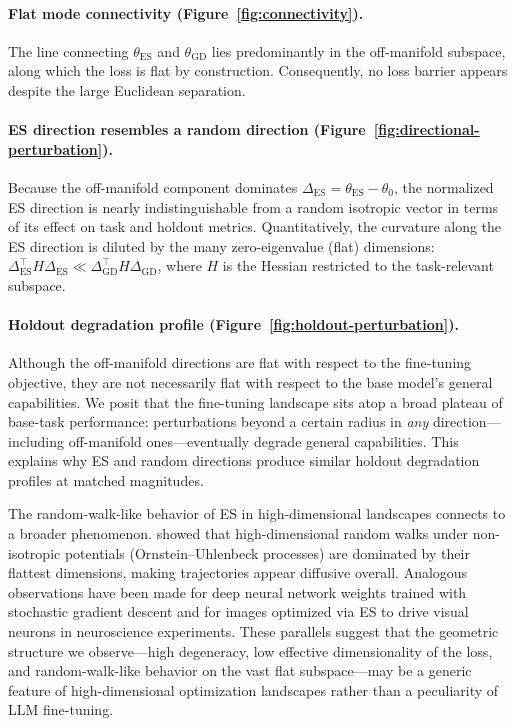 \paragraph{Flat mode connectivity (Figure~\ref{fig:connectivity}).} The line connecting $\theta_{\mathrm{ES}}$ and $\theta_{\mathrm{GD}}$ lies predominantly in the off-manifold subspace, along which the loss is flat by construction. Consequently, no loss barrier appears despite the large Euclidean separation.

\paragraph{ES direction resembles a random direction (Figure~\ref{fig:directional-perturbation}).} Because the off-manifold component dominates $\Delta_{\mathrm{ES}} = \theta_{\mathrm{ES}} - \theta_0$, the normalized ES direction is nearly indistinguishable from a random isotropic vector in terms of its effect on task and holdout metrics. Quantitatively, the curvature along the ES direction is diluted by the many zero-eigenvalue (flat) dimensions: $\Delta_{\mathrm{ES}}^\top H \Delta_{\mathrm{ES}} \ll \Delta_{\mathrm{GD}}^\top H \Delta_{\mathrm{GD}}$, where $H$ is the Hessian restricted to the task-relevant subspace.

\paragraph{Holdout degradation profile (Figure~\ref{fig:holdout-perturbation}).} Although the off-manifold directions are flat with respect to the fine-tuning objective, they are not necessarily flat with respect to the base model's general capabilities. We posit that the fine-tuning landscape sits atop a broad plateau of base-task performance: perturbations beyond a certain radius in \emph{any} direction—including off-manifold ones—eventually degrade general capabilities. This explains why ES and random directions produce similar holdout degradation profiles at matched magnitudes.

\begin{remark}
The random-walk-like behavior of ES in high-dimensional landscapes connects to a broader phenomenon. \citet{antognini2018pca_highdim_random_walk} showed that high-dimensional random walks under non-isotropic potentials (Ornstein--Uhlenbeck processes) are dominated by their flattest dimensions, making trajectories appear diffusive overall. Analogous observations have been made for deep neural network weights trained with stochastic gradient descent and for images optimized via ES to drive visual neurons in neuroscience experiments. These parallels suggest that the geometric structure we observe—high degeneracy, low effective dimensionality of the loss, and random-walk-like behavior on the vast flat subspace—may be a generic feature of high-dimensional optimization landscapes rather than a peculiarity of LLM fine-tuning.
\end{remark}